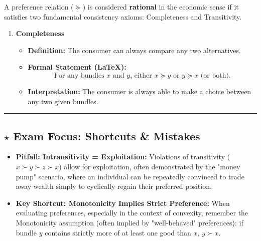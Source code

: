 \documentclass{article}
\begin{document}
A preference relation ($\succeq$) is considered \textbf{rational} in the economic sense if it satisfies two fundamental consistency axioms: Completeness and Transitivity.

\begin{enumerate}
    \item \textbf{Completeness}
    \begin{itemize}
        \item \textbf{Definition:} The consumer can always compare any two alternatives.
        \item \textbf{Formal Statement (LaTeX):} \[\text{For any bundles } x \text{ and } y \text{, either } x \succeq y \text{ or } y \succeq x \text{ (or both).}\]
        \item \textbf{Interpretation:} The consumer is always able to make a choice between any two given bundles.
    \end{itemize}
\end{enumerate}

\noindent\rule{\textwidth}{0.4pt}

\subsection*{$\star$ Exam Focus: Shortcuts \& Mistakes}

\begin{itemize}
    \item \textbf{Pitfall: Intransitivity = Exploitation:} Violations of transitivity ($x \succ y \succ z \succ x$) allow for exploitation, often demonstrated by the "money pump" scenario, where an individual can be repeatedly convinced to trade away wealth simply to cyclically regain their preferred position.
    \item \textbf{Key Shortcut: Monotonicity Implies Strict Preference:} When evaluating preferences, especially in the context of convexity, remember the Monotonicity assumption (often implied by "well-behaved" preferences): if bundle $y$ contains strictly more of at least one good than $x$, $y \succ x$.
\end{itemize}
\end{document}
